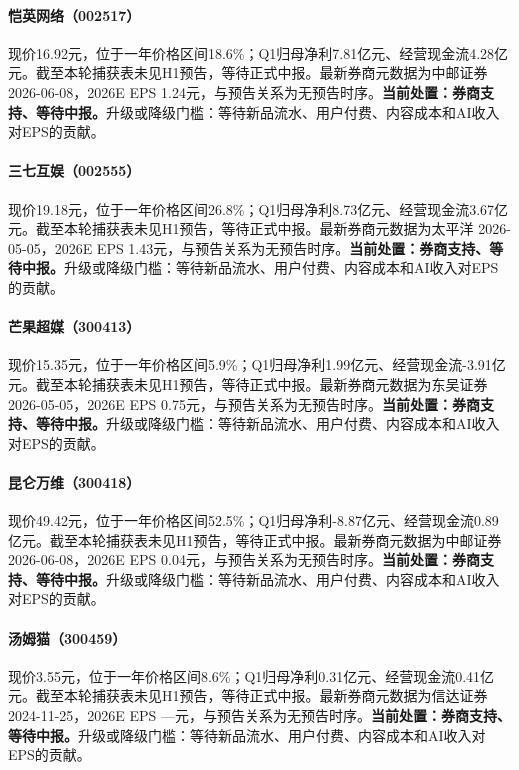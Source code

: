 \paragraph{恺英网络（002517）}
现价16.92元，位于一年价格区间18.6\%；Q1归母净利7.81亿元、经营现金流4.28亿元。截至本轮捕获表未见H1预告，等待正式中报。最新券商元数据为中邮证券 2026-06-08，2026E EPS 1.24元，与预告关系为无预告时序。\textbf{当前处置：券商支持、等待中报。}升级或降级门槛：等待新品流水、用户付费、内容成本和AI收入对EPS的贡献。

\paragraph{三七互娱（002555）}
现价19.18元，位于一年价格区间26.8\%；Q1归母净利8.73亿元、经营现金流3.67亿元。截至本轮捕获表未见H1预告，等待正式中报。最新券商元数据为太平洋 2026-05-05，2026E EPS 1.43元，与预告关系为无预告时序。\textbf{当前处置：券商支持、等待中报。}升级或降级门槛：等待新品流水、用户付费、内容成本和AI收入对EPS的贡献。

\paragraph{芒果超媒（300413）}
现价15.35元，位于一年价格区间5.9\%；Q1归母净利1.99亿元、经营现金流-3.91亿元。截至本轮捕获表未见H1预告，等待正式中报。最新券商元数据为东吴证券 2026-05-05，2026E EPS 0.75元，与预告关系为无预告时序。\textbf{当前处置：券商支持、等待中报。}升级或降级门槛：等待新品流水、用户付费、内容成本和AI收入对EPS的贡献。

\paragraph{昆仑万维（300418）}
现价49.42元，位于一年价格区间52.5\%；Q1归母净利-8.87亿元、经营现金流0.89亿元。截至本轮捕获表未见H1预告，等待正式中报。最新券商元数据为中邮证券 2026-06-08，2026E EPS 0.04元，与预告关系为无预告时序。\textbf{当前处置：券商支持、等待中报。}升级或降级门槛：等待新品流水、用户付费、内容成本和AI收入对EPS的贡献。

\paragraph{汤姆猫（300459）}
现价3.55元，位于一年价格区间8.6\%；Q1归母净利0.31亿元、经营现金流0.41亿元。截至本轮捕获表未见H1预告，等待正式中报。最新券商元数据为信达证券 2024-11-25，2026E EPS ---元，与预告关系为无预告时序。\textbf{当前处置：券商支持、等待中报。}升级或降级门槛：等待新品流水、用户付费、内容成本和AI收入对EPS的贡献。

